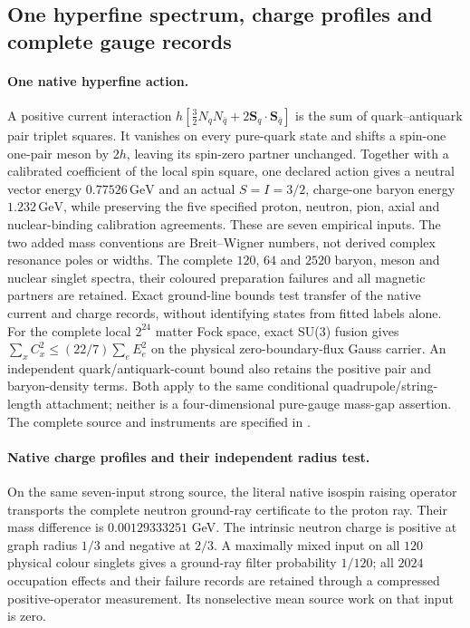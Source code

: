 \subsection{One hyperfine spectrum, charge profiles and complete gauge records}
\label{sec:hyperfine-charge-gauge-records}

\paragraph{One native hyperfine action.}
A positive current interaction
$h[\tfrac32N_qN_{\bar q}+2\mathbf S_q\cdot\mathbf S_{\bar q}]$
is the sum of quark--antiquark pair triplet squares. It vanishes on every
pure-quark state and shifts a spin-one one-pair meson by $2h$, leaving its
spin-zero partner unchanged. Together with a calibrated coefficient of the
local spin square, one declared action gives a neutral vector
energy $0.77526\,\mathrm{GeV}$ and an actual $S=I=3/2$, charge-one baryon
energy $1.232\,\mathrm{GeV}$, while preserving the five specified proton,
neutron, pion, axial and nuclear-binding calibration agreements. These are
seven empirical inputs. The two added mass conventions are Breit--Wigner
numbers, not derived complex resonance poles or widths.
The complete $120$, $64$ and $2520$ baryon, meson and nuclear singlet
spectra, their coloured preparation failures and all magnetic partners are
retained. Exact ground-line bounds test transfer of the native current and
charge records, without identifying states from fitted labels alone.
For the complete local $2^{24}$ matter Fock space, exact SU(3) fusion gives
$\sum_x C_x^2\leq(22/7)\sum_e E_e^2$ on the physical zero-boundary-flux
Gauss carrier. An independent quark/antiquark-count bound also retains the
positive pair and baryon-density terms. Both apply to the same conditional
quadrupole/string-length attachment; neither is a four-dimensional
pure-gauge mass-gap assertion.
The complete source and instruments are specified in .

\paragraph{Native charge profiles and their independent radius test.}
On the same seven-input strong source, the literal native isospin raising
operator transports the complete neutron ground-ray certificate to the
proton ray. Their mass difference is $0.00129333251$ GeV. The intrinsic
neutron charge is positive at graph radius $1/3$ and negative at $2/3$.
A maximally mixed input on all $120$ physical colour singlets gives a
ground-ray filter probability $1/120$; all $2024$ occupation effects and
their failure records are retained through a compressed positive-operator
measurement. Its nonselective mean source work on that input is zero.

